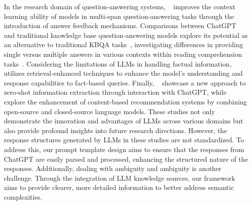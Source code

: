 In the research domain of question-answering systems, ~\citep{huang2023enhancing} improves the context learning ability of models in multi-span question-answering tasks through the introduction of answer feedback mechanisms. 
Comparisons between ChatGPT and traditional knowledge base question-answering models explore its potential as an alternative to traditional KBQA tasks~\citep{tan2023can}, 
investigating differences in providing single versus multiple answers in various contexts within reading comprehension tasks~\citep{zhang2023many}. 
Considering the limitations of LLMs in handling factual information, ~\citep{ren2023investigating} utilizes retrieval-enhanced techniques to enhance the model's understanding and response capabilities to fact-based queries.
Finally, ~\citep{wei2023zero} showcase a new approach to zero-shot information extraction through interaction with ChatGPT, 
while~\citep{liu2023once} explore the enhancement of content-based recommendation systems by combining open-source and closed-source language models. 
These studies not only demonstrate the innovation and advantages of LLMs across various domains but also provide profound insights into future research directions. 
However, the response structures generated by LLMs in these studies are not standardized. 
To address this, our prompt template design aims to ensure that the responses from ChatGPT are easily parsed and processed, enhancing the structured nature of the responses. 
Additionally, dealing with ambiguity and ambiguity is another challenge. 
Through the integration of LLM knowledge sources, our framework aims to provide clearer, more detailed information to better address semantic complexities.



